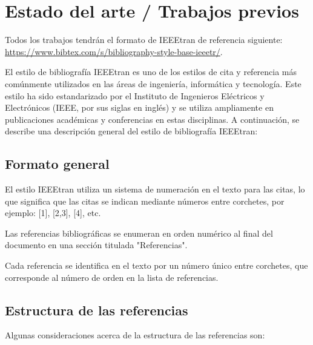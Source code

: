 \label{chapter:estado-arte}\chapter[Estado del arte]{Estado del arte / Trabajos previos}

Todos los trabajos tendrán el formato de IEEEtran de referencia siguiente: \url{https://www.bibtex.com/s/bibliography-style-base-ieeetr/}.

El estilo de bibliografía IEEEtran es uno de los estilos de cita y referencia más comúnmente utilizados en las áreas de ingeniería, informática y tecnología. Este estilo ha sido estandarizado por el Instituto de Ingenieros Eléctricos y Electrónicos (IEEE, por sus siglas en inglés) y se utiliza ampliamente en publicaciones académicas y conferencias en estas disciplinas. A continuación, se describe una descripción general del estilo de bibliografía IEEEtran:

\section{Formato general}

El estilo IEEEtran utiliza un sistema de numeración en el texto para las citas, lo que significa que las citas se indican mediante números entre corchetes, por ejemplo: [1], [2,3], [4], etc.

Las referencias bibliográficas se enumeran en orden numérico al final del documento en una sección titulada "Referencias".

Cada referencia se identifica en el texto por un número único entre corchetes, que corresponde al número de orden en la lista de referencias.

\section{Estructura de las referencias}

Algunas consideraciones acerca de la estructura de las referencias son:

